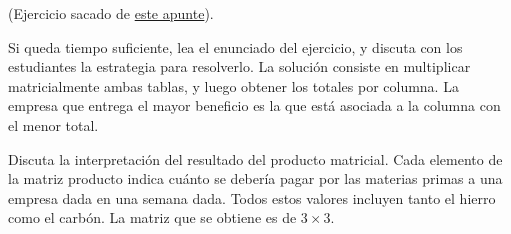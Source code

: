 \documentclass[10pt]{article}
\begin{document}

  (Ejercicio sacado de \href{http://optimierung.mathematik.uni-kl.de/mamaeusch/veroeffentlichungen/ver_texte/matrizenrechnung_spanish.pdf}{este apunte}).

  Si queda tiempo suficiente,
  lea el enunciado del ejercicio,
  y discuta con los estudiantes
  la estrategia para resolverlo.
  La solución consiste en multiplicar matricialmente ambas tablas,
  y luego obtener los totales por columna.
  La empresa que entrega el mayor beneficio
  es la que está asociada a la columna con el menor total.

  Discuta la interpretación del resultado del producto matricial.
  Cada elemento de la matriz producto
  indica cuánto se debería pagar por las materias primas
  a una empresa dada en una semana dada.
  Todos estos valores incluyen tanto el hierro como el carbón.
  La matriz que se obtiene es de \(3\times 3\).
\end{document}
